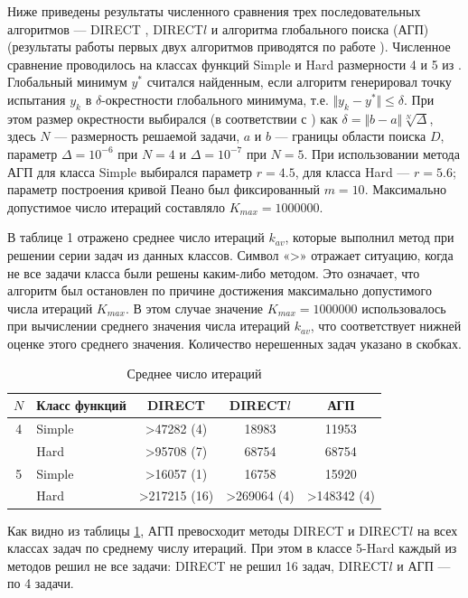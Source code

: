 Ниже приведены результаты численного сравнения трех последовательных алгоритмов --- DIRECT \cite{jonesLipOpt}, DIRECT\(l\)  \cite{gablonskyDirect} и алгоритма глобального поиска (АГП) (результаты работы первых двух алгоритмов приводятся по работе \cite{sergKvaDiaPaper}). Численное сравнение проводилось на классах функций Simple и Hard размерности 4 и 5 из \cite{sergKvaDiaPaper}. Глобальный минимум \(y^*\) считался найденным, если алгоритм генерировал точку испытания \(y_k\) в \(\delta\)-окрестности глобального минимума, т.е. \(\Vert y_k-y^*\Vert\leqslant\delta\). При этом размер окрестности выбирался (в соответствии с \cite{sergKvaDiaPaper}) как \(\delta=\Vert b-a\Vert \sqrt[N]{\Delta}\), здесь \(N\) --- размерность решаемой задачи, \(a\) и \(b\) --- границы области поиска \(D\), параметр \(\Delta=10^{-6}\) при \(N=4\) и \(\Delta=10^{-7}\) при \(N=5\). При использовании метода АГП для класса Simple выбирался параметр \(r=4.5\), для класса Hard --- \(r=5.6\); параметр построения кривой Пеано был фиксированный \(m=10\). Максимально допустимое число итераций составляло \(K_{max} = 1 000 000\).
\par
В таблице 1 отражено среднее число итераций \(k_{av}\), которые выполнил метод при решении серии задач из данных классов. Символ «>» отражает ситуацию, когда не все задачи класса были решены каким-либо методом. Это означает, что алгоритм был остановлен по причине достижения максимально допустимого числа итераций \(K_{max}\). В этом случае значение \(K_{max}=1 000 000\) использовалось при вычислении среднего значения числа итераций \(k_{av}\), что соответствует нижней оценке этого среднего значения. Количество нерешенных задач указано в скобках.
\begin{table}
    \centering
    \begin{tabular}{|c|p{3cm}|c|c|c|}
    \hline
    \(N\) & Класс функций & DIRECT & DIRECT\(l\) & АГП \\ \hline
    4 & Simple & >47282 (4) & 18983 & 11953\\ \cline{2-5}
      & Hard & >95708 (7) & 68754 & 68754\\ \hline
    5 & Simple & >16057 (1) & 16758 & 15920\\ \cline{2-5}
      & Hard & >217215 (16) & >269064 (4) & >148342 (4)\\ \hline
    \end{tabular}
    \caption{Среднее число итераций}
    \label{table:average_iters}
\end{table}
\par
Как видно из таблицы \ref{table:average_iters}, АГП превосходит методы DIRECT и DIRECT\(l\) на всех классах задач по среднему числу итераций. При этом в классе 5-Hard каждый из методов решил не все задачи: DIRECT не решил 16 задач, DIRECT\(l\) и АГП --- по 4 задачи.

